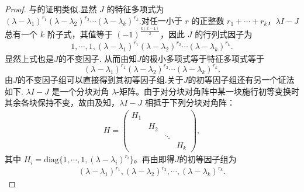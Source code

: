 \documentclass[../../main.tex]{subfiles}%
\begin{document}
\begin{proof}

与的证明类似.显然 $J$ 的特征多项式为 $(\lambda - \lambda_1)^{r_1}(\lambda - \lambda_2)^{r_2}\cdots(\lambda - \lambda_k)^{r_k}.$对任一小于 $r$ 的正整数 $r_1+\cdots+r_k$，$\lambda I - J$ 总有一个 $k$ 阶子式，其值等于 $(-1)^{\frac{k(k-1)}{2}}$，因此 $J$ 的行列式因子为
\begin{align*}
1,\cdots,1,(\lambda - \lambda_1)^{r_1}(\lambda - \lambda_2)^{r_2}\cdots(\lambda - \lambda_k)^{r_k}.
\end{align*}
显然上式也是$J$的不变因子.
从而由知$J$的极小多项式等于特征多项式等于
$$
(\lambda - \lambda_1)^{r_1}(\lambda - \lambda_2)^{r_2}\cdots(\lambda - \lambda_k)^{r_k}.
$$
由$J$的不变因子组可以直接得到其初等因子组.关于$J$的初等因子组还有另一个证法如下.
$\lambda I - J$ 是一个分块对角 $\lambda$-矩阵。由于对分块对角阵中某一块施行初等变换时其余各块保持不变，故由及知，$\lambda I - J$ 相抵于下列分块对角阵：
\begin{align*}
H = \begin{pmatrix}
H_1 & & & \\
& H_2 & & \\
& & \ddots & \\
& & & H_k
\end{pmatrix},
\end{align*}
其中 $H_i = \mathrm{diag}\{1,\cdots,1,(\lambda - \lambda_i)^{r_i}\}$。再由即得$J$的初等因子组为
\begin{align*}
(\lambda - \lambda_1)^{r_1}, (\lambda - \lambda_2)^{r_2}, \cdots, (\lambda - \lambda_k)^{r_k}.
\end{align*}

\end{proof}
\end{document}
